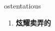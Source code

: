 
\begin{frame}
{\huge ostentatious}
\begin{center}
\begin{enumerate}\Large
  \item \textbf{炫耀卖弄的}
\end{enumerate}
\end{center}
\end{frame}
